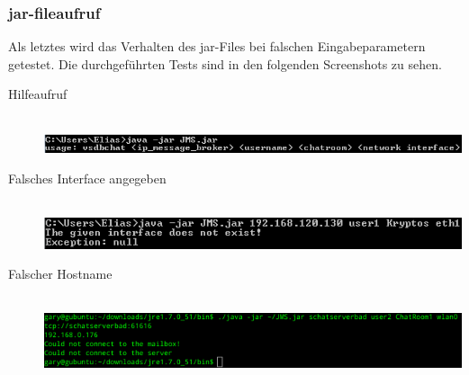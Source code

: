 \documentclass[11pt, a4paper]{article}
\begin{document}
\subsubsection{jar-fileaufruf}
Als letztes wird das Verhalten des jar-Files bei falschen Eingabeparametern getestet.
Die durchgeführten Tests sind in den folgenden Screenshots zu sehen.

\begin{center}
  \begin{description}
  \item[Hilfeaufruf] \hfill \\
    \includegraphics[width=6in]{pic/help.png}
  \item[Falsches Interface angegeben] \hfill \\
    \includegraphics[width=6in]{pic/wrongiface.png}
  \item[Falscher Hostname] \hfill \\
    \includegraphics[width=6in]{pic/badhost.png}
  \end{description}
\end{center}

\newpage
\end{document}
